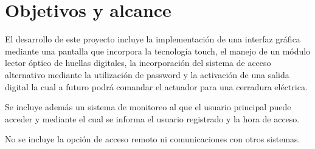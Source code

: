 




\section{Objetivos y alcance}

El desarrollo de este proyecto incluye la implementación de una interfaz gráfica mediante una pantalla que incorpora la tecnología touch, el manejo de un módulo lector óptico de huellas digitales, la incorporación del sistema de acceso alternativo mediante la utilización de password y la activación de una salida digital la cual a futuro podrá comandar el actuador para una cerradura eléctrica.

Se incluye además un sistema de monitoreo al que el usuario principal puede acceder y mediante el cual se informa el usuario registrado y la hora de acceso.

No se incluye la opción de acceso remoto ni comunicaciones con otros sistemas.

